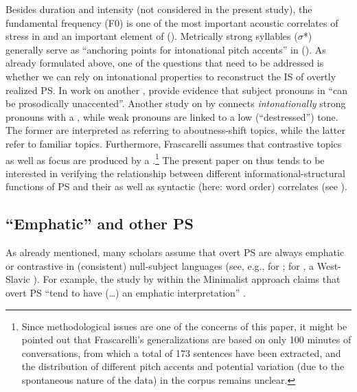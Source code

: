 \documentclass[output=paper]{langsci/langscibook}
\begin{document}
Besides duration and intensity (not considered in the present study), the fundamental frequency (F0) is one of the most important acoustic correlates of stress in  and an important element of  (\citealt[239--246]{Hualde2005}). Metrically strong syllables ($\sigma $*) generally serve as ``anchoring points for intonational pitch accents'' in  (\citealt[358]{Hualde2015}). As already formulated above, one of the questions that need to be addressed is whether we can rely on intonational properties to reconstruct the IS of overtly realized PS. In work on another  , \citet[58]{Cardinaletti1999} provide evidence that subject pronouns in  ``can be prosodically unaccented''. Another study on  by \citet[695]{Frascarelli2007} connects \textit{intonationally} strong pronouns with a , while weak pronouns are linked to a low (``destressed'') tone. The former are interpreted as referring to aboutness-shift topics, while the latter refer to familiar topics. Furthermore, Frascarelli assumes that contrastive topics as well as focus are produced by a .\footnote{Since methodological issues are one of the concerns of this paper, it might be pointed out that Frascarelli’s generalizations are based on only 100 minutes of conversations, from which a total of 173 sentences have been extracted, and the distribution of different pitch accents and potential variation (due to the spontaneous nature of the data) in the corpus remains unclear.}\textsuperscript{} The present paper on  thus tends to be interested in verifying the relationship between different informational-structural functions of PS and their  as well as syntactic (here: word order) correlates (see ).

\subsection{``Emphatic'' and other PS}
\label{sec:pes:2.2}
As already mentioned, many scholars assume that overt PS are always emphatic or contrastive in (consistent) null-subject languages (see, e.g., \citealt[1311-1312]{Lujan1999} for ; \citealt[199]{Fehrmann2008} for , a West-Slavic ). For example, the study by \citet[7]{Biberauer2010} within the Minimalist approach claims that overt PS ``tend to have (…) an emphatic interpretation'' .
\end{document}
